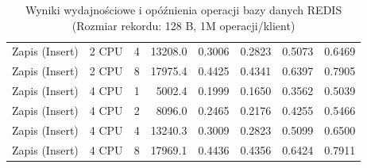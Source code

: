 \begin{table}[ht]
{\begin{tabular}{llcrrrrr}
Zapis (Insert) & 2 CPU & 4 & 13208.0 & 0.3006 & 0.2823 & 0.5073 & 0.6469 \\
Zapis (Insert) & 2 CPU & 8 & 17975.4 & 0.4425 & 0.4341 & 0.6397 & 0.7905 \\
Zapis (Insert) & 4 CPU & 1 & 5002.4 & 0.1999 & 0.1650 & 0.3562 & 0.5039 \\
Zapis (Insert) & 4 CPU & 2 & 8096.0 & 0.2465 & 0.2176 & 0.4255 & 0.5466 \\
Zapis (Insert) & 4 CPU & 4 & 13240.3 & 0.3009 & 0.2823 & 0.5099 & 0.6500 \\
Zapis (Insert) & 4 CPU & 8 & 17969.1 & 0.4436 & 0.4356 & 0.6424 & 0.7911 \\
\bottomrule
\end{tabular}%
}
\caption{Wyniki wydajnościowe i opóźnienia operacji bazy danych REDIS (Rozmiar rekordu: 128 B, 1M operacji/klient)}
\label{tab:latency_redis_small_1000000}
\end{table}
